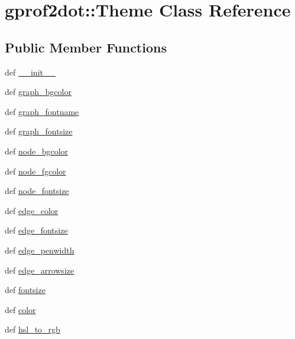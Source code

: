 \hypertarget{classgprof2dot_1_1Theme}{
\section{gprof2dot::Theme Class Reference}
\label{classgprof2dot_1_1Theme}
}
\subsection*{Public Member Functions}
\begin{DoxyCompactItemize}
\item 
def \hyperlink{classgprof2dot_1_1Theme_a2276398a6eb51a85e845a9783f016de3}{\_\-\_\-init\_\-\_\-}
\item 
def \hyperlink{classgprof2dot_1_1Theme_a2aa94a61ff03ea9ecb2750a0bc973cc6}{graph\_\-bgcolor}
\item 
def \hyperlink{classgprof2dot_1_1Theme_ac19dbd4cd62fc32036f38281b4fb907d}{graph\_\-fontname}
\item 
def \hyperlink{classgprof2dot_1_1Theme_abdff38cc909ec02243380fe8c36d9ae3}{graph\_\-fontsize}
\item 
def \hyperlink{classgprof2dot_1_1Theme_af53963ae08324fb767cf33507939f2bb}{node\_\-bgcolor}
\item 
def \hyperlink{classgprof2dot_1_1Theme_a1da7ce754a3295e8d8b1c3ee894a26d9}{node\_\-fgcolor}
\item 
def \hyperlink{classgprof2dot_1_1Theme_a55ad08f330951306d25ce4136504ee99}{node\_\-fontsize}
\item 
def \hyperlink{classgprof2dot_1_1Theme_a85837bcc37f0f91e64f0ca2befee6b35}{edge\_\-color}
\item 
def \hyperlink{classgprof2dot_1_1Theme_ae4ab4caa326507a32a5ac37559233cef}{edge\_\-fontsize}
\item 
def \hyperlink{classgprof2dot_1_1Theme_a5189df543f27823cf5e63a34188ae4b7}{edge\_\-penwidth}
\item 
def \hyperlink{classgprof2dot_1_1Theme_a59ecac3b7ca9af819986f1a192bc09cf}{edge\_\-arrowsize}
\item 
def \hyperlink{classgprof2dot_1_1Theme_a1993203595812ae5d364c689ea8a702f}{fontsize}
\item 
def \hyperlink{classgprof2dot_1_1Theme_a7888f53604929f6c1589e0a687e9d3c7}{color}
\item 
def \hyperlink{classgprof2dot_1_1Theme_a43c94f70fd826ed62491db02de4ef46f}{hsl\_\-to\_\-rgb}
\end{DoxyCompactItemize}
